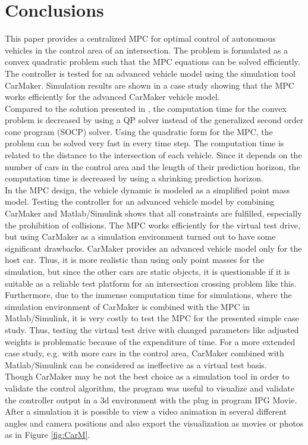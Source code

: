 \documentclass[letterpaper,10pt,conference]{ieeeconf}
\begin{document}
\section{Conclusions}
This paper provides a centralized MPC for optimal control of autonomous vehicles in the control area of an intersection. The problem is formulated as a convex quadratic problem such that the MPC equations can be solved efficiently. The controller is tested for an advanced vehicle model using the simulation tool CarMaker. Simulation results are shown in a case study showing that the MPC works efficiently for the advanced CarMaker vehicle model.\\ \indent
Compared to the solution presented in \cite{nikolce}, the computation time for the convex problem is decreased by using a QP solver instead of the generalized second order cone program (SOCP) solver. Using the quadratic form for the MPC, the problem can be solved very fast in every time step. The computation time is related to the distance to the intersection of each vehicle. Since it depends on the number of cars in the control area and the length of their prediction horizon, the computation time is decreased by using a shrinking prediction horizon.\\ \indent
In the MPC design, the vehicle dynamic is modeled as a simplified point mass model. Testing the controller for an advanced vehicle model by combining CarMaker and Matlab/Simulink shows that all constraints are fulfilled, especially the prohibition of collisions. The MPC works efficiently for the virtual test drive, but using CarMaker as a simulation environment turned out to have some significant drawbacks. CarMaker provides an advanced vehicle model only for the host car. Thus, it is more realistic than using only point masses for the simulation, but since the other cars are static objects, it is questionable if it is suitable as a reliable test platform for an intersection crossing problem like this. Furthermore, due to the immense computation time for simulations, where the simulation environment of CarMaker is combined with the MPC in Matlab/Simulink, it is very costly to test the MPC for the presented simple case study. Thus, testing the virtual test drive with changed parameters like adjusted weights is problematic because of the expenditure of time. For a more extended case study, e.g. with more cars in the control area, CarMaker combined with Matlab/Simulink can be considered as ineffective as a virtual test basis.\\ \indent
Though CarMaker may be not the best choice as a simulation tool in order to validate the control algorithm, the program was useful to visualize and validate the controller output in a 3d environment with the plug in program IPG Movie. After a simulation it is possible to view a video animation in several different angles and camera positions and also export the visualization as movies or photos as in Figure \ref{fig:CarM}.\\ \indent
\end{document}
